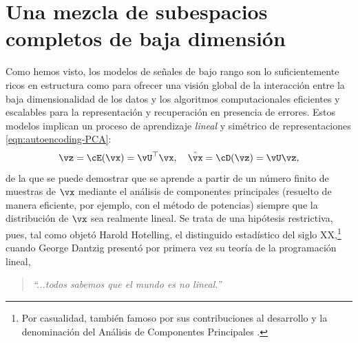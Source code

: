 \documentclass[../../book-main.tex]{subfiles}
\begin{document}
\section{Una mezcla de subespacios completos de baja dimensión}%
\label{sec:ica}
Como hemos visto, los modelos de señales de bajo rango son lo suficientemente 
ricos en estructura como para ofrecer una visión global de la interacción entre 
la baja dimensionalidad de los datos y los algoritmos computacionales eficientes 
y escalables para la representación y recuperación en presencia de errores.
Estos modelos implican un proceso de aprendizaje \textit{lineal} y simétrico de representaciones 
\eqref{eqn:autoencoding-PCA}:
\begin{equation*}
    \vz = \cE(\vx) = \vU^\top \vx, \quad \hat{\vx} = \cD(\vz) = \vU \vz,
\end{equation*}
de la que se puede demostrar que se aprende a partir de un número finito de muestras de $\vx$ mediante
el análisis de componentes principales (resuelto de manera eficiente, por ejemplo, con el 
método de potencias) siempre que la distribución de $\vx$ sea realmente lineal.
Se trata de una hipótesis restrictiva, pues, tal como objetó Harold Hotelling, el
distinguido estadístico del siglo XX,\footnote{Por casualidad,
    también famoso por sus contribuciones al desarrollo y la denominación del
Análisis de Componentes Principales \cite{Hotelling1933}.} 
cuando George Dantzig presentó por primera vez su teoría de la
programación lineal\cite{Dantzig2002-eh},
\begin{quote}
    \centering
    \textit{``...todos sabemos que el mundo es no lineal.''}
\end{quote}
\end{document}
